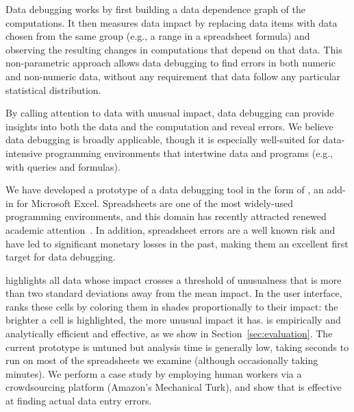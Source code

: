 Data debugging works by first building a data dependence graph of the
computations. It then measures data impact by replacing data items
with data chosen from the same group (e.g., a range in a spreadsheet
formula) and observing the resulting changes in computations that
depend on that data. This non-parametric approach allows data
debugging to find errors in both numeric and non-numeric data, without
any requirement that data follow any particular statistical
distribution.

By calling attention to data with unusual impact, data debugging can
provide insights into both the data and the computation and reveal
errors. We believe data debugging is broadly applicable, though it is
especially well-suited for data-intensive programming environments that intertwine
data and programs (e.g., with queries and formulas).

We have developed a prototype of a data debugging tool in the form
of \checkcell{}, an add-in for Microsoft Excel. Spreadsheets are one
of the most widely-used programming environments, and this domain has
recently attracted renewed academic
attention~\cite{DBLP:conf/popl/Gulwani11,DBLP:conf/pldi/HarrisG11,Singh:2012:LSS:2212351.2212356}.
In addition, spreadsheet errors are a well known risk and have led to
significant monetary losses in the past, making them an excellent
first target for data debugging.

\checkcell{} highlights all data whose impact crosses a threshold of
unusualness that is more than two standard deviations away from the
mean impact.  In the user interface, \checkcell{} ranks these cells by
coloring them in shades proportionally to their impact: the brighter a
cell is highlighted, the more unusual impact it has. \checkcell{} is
empirically and analytically efficient and effective, as we show in
Section~\ref{sec:evaluation}. The current prototype is untuned but
analysis time is generally low, taking seconds to run on most of the
spreadsheets we examine (although occasionally taking minutes). We
perform a case study by employing human workers via a crowdsourcing
platform (Amazon's Mechanical Turk), and show that \checkcell{} is
effective at finding actual data entry errors.

